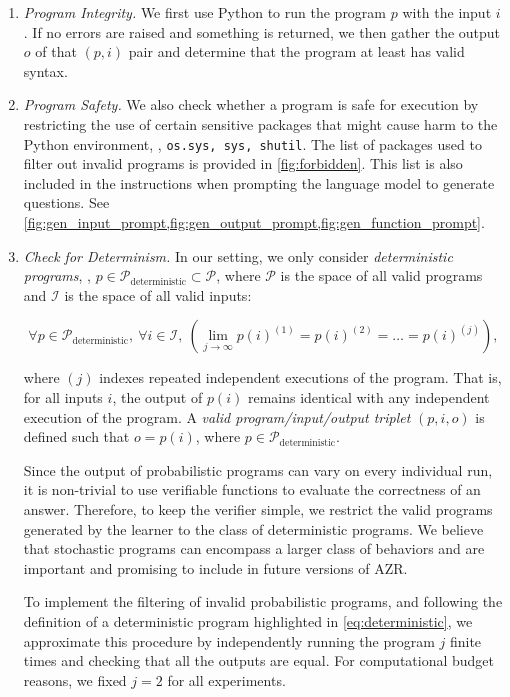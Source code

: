 \documentclass{article}
\begin{document}
\begin{enumerate}[leftmargin=*]
    \item \emph{Program Integrity.}
We first use Python to run the program \(p\) with the input \(i\). If no errors are raised and something is returned, we then gather the output \(o\) of that \((p, i)\) pair and determine that the program at least has valid syntax.
    \item \emph{Program Safety.}
We also check whether a program is safe for execution by restricting the use of certain sensitive packages that might cause harm to the Python environment, \ie, \texttt{os.sys, sys, shutil}. The list of packages used to filter out invalid programs is provided in \cref{fig:forbidden}. This list is also included in the instructions when prompting the language model to generate questions. See \cref{fig:gen_input_prompt,fig:gen_output_prompt,fig:gen_function_prompt}.
  \item \emph{Check for Determinism.} In our setting, we only consider \emph{deterministic programs}, \ie, \(p \in \mathscr{P}_{\text{deterministic}} \subset \mathscr{P}\), where \(\mathscr{P}\) is the space of all valid programs and \(\mathscr{I}\) is the space of all valid inputs:

\begin{equation}
    \forall p \in \mathscr{P}_{\text{deterministic}},\ \forall i \in \mathscr{I},\ \left( \lim_{j \to \infty} p(i)^{(1)} = p(i)^{(2)} = \dots = p(i)^{(j)} \right),
    \label{eq:deterministic}
\end{equation}

where \((j)\) indexes repeated independent executions of the program. That is, for all inputs \(i\), the output of \(p(i)\) remains identical with any independent execution of the program. A \emph{valid program/input/output triplet} \((p,i,o)\) is defined such that \(o = p(i)\), where \(p \in \mathscr{P}_{\text{deterministic}}\).

Since the output of probabilistic programs can vary on every individual run, it is non-trivial to use verifiable functions to evaluate the correctness of an answer. Therefore, to keep the verifier simple, we restrict the valid programs generated by the learner to the class of deterministic programs. We believe that stochastic programs can encompass a larger class of behaviors and are important and promising to include in future versions of AZR.

To implement the filtering of invalid probabilistic programs, and following the definition of a deterministic program highlighted in \cref{eq:deterministic}, we approximate this procedure by independently running the program \(j\) finite times and checking that all the outputs are equal. For computational budget reasons, we fixed \(j = 2\) for all experiments.
\end{enumerate}
\end{document}
